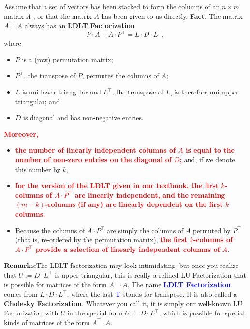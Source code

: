 \documentclass[letterpaper]{book}
\begin{document}
\begin{tcolorbox}[sharp corners, colback=green!30, colframe=green!80!blue,
title=\textbf{ {\Large \textcolor{red}{\bf Uber} Pro-Tip:} \large Number of Linearly Independent Vectors via an Enhanced LU Factorization}]
Assume that a set of vectors has been stacked to form the columns of an $n \times m$ matrix $A$ , or that the matrix $A$ has been given to us directly. \textbf{Fact:} The matrix $A^\top \cdot A$ always has an \textbf{LDLT Factorization}
\begin{equation}
    \label{eq:LDLTfactorization}
    P\cdot A^\top \cdot A \cdot P^\top = L\cdot D \cdot L^\top,
\end{equation}
where
\begin{itemize}
    \item $P$ is a (row) permutation matrix;
    \item $P^\top$, the transpose of $P$, permutes the columns of $A$;
    \item $L$ is uni-lower triangular and $L^\top$, the transpose of $L$, is therefore uni-upper triangular; and
    \item $D$ is diagonal and has non-negative entries.
\end{itemize}
\textcolor{red}{\bf Moreover,}
\begin{itemize}
    \item \textcolor{red}{\bf the number of linearly independent columns of $A$ is equal to the number of non-zero entries on the diagonal of $D$;} and, if we denote this number by $k$,
    \item  \textcolor{red}{\bf for the version of the LDLT given in our textbook, the first $k$-columns of $A \cdot P^\top$ are linearly independent, and the remaining $(m-k)$-columns (if any) are linearly dependent on the first $k$ columns.} 
    \item Because the columns of $A\cdot P^\top$ are simply the columns of $A$ permuted by $P^\top$ (that is, re-ordered by the permutation matrix), \textcolor{red}{\bf the first $k$-columns of $A \cdot P^\top$ provide a selection of linearly independent columns of $A$}.
\end{itemize}

\end{tcolorbox}

\vspace*{.2cm} 
\textbf{Remarks:}The LDLT factorization may look intimidating, but once you realize that $U:=D \cdot L^\top$ is upper triangular, this is really a refined LU Factorization that is possible for matrices of the form $A^\top \cdot A$. The name \textcolor{blue}{\bf LDLT Factorization} comes from $L\cdot D \cdot L^\top$, where the last \textcolor{blue}{\bf T} stands for transpose. It is also called a \textbf{Cholesky Factorization}. Whatever you call it, it is simply our well-known LU Factorization with $U$ in the special form  $U:=D \cdot L^\top$, which is possible for special kinds of matrices of the form $A^\top \cdot A$. \\
\end{document}

